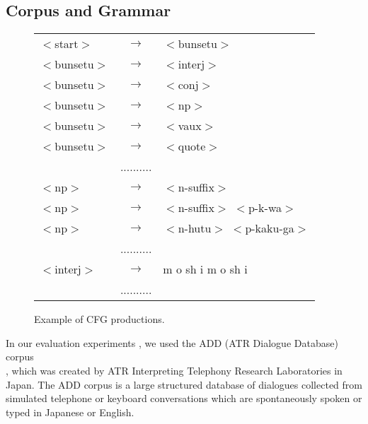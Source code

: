 \subsection{Corpus and Grammar}

\begin{figure}[b]
\begin{center}
\begin{tabular}{lcl}
\hline
     $<$start$>$   & $\longrightarrow$ &  $<$bunsetu$>$	\\
     $<$bunsetu$>$ & $\longrightarrow$ &  $<$interj$>$	\\
     $<$bunsetu$>$ & $\longrightarrow$ &  $<$conj$>$	\\
     $<$bunsetu$>$ & $\longrightarrow$ &  $<$np$>$	\\
     $<$bunsetu$>$ & $\longrightarrow$ &  $<$vaux$>$	\\
     $<$bunsetu$>$ & $\longrightarrow$ &  $<$quote$>$	\\
		&     ..........	\\
     $<$np$>$	   & $\longrightarrow$ &  $<$n-suffix$>$ \\
     $<$np$>$	   & $\longrightarrow$ &  $<$n-suffix$>$  $<$p-k-wa$>$\\
     $<$np$>$	   & $\longrightarrow$ &  $<$n-hutu$>$  $<$p-kaku-ga$>$\\
		&     ..........	\\
     $<$interj$>$  & $\longrightarrow$ &  m o sh i m o sh i	\\
		&     ..........	\\
\hline
\end{tabular}
\end{center}
\caption{Example of CFG productions.} \label{Fig:Prods}
\end{figure}

In \hspace*{1mm}our \hspace*{1mm}evaluation \hspace*{1mm}experiments , \hspace*{1mm}we \hspace*{1mm}used \hspace*{1mm}the \hspace*{1mm}ADD \hspace*{1mm}(ATR Dialogue Database) \hspace*{1mm}corpus \\
\cite{Ehara90} , which was created by ATR Interpreting Telephony Research Laboratories in Japan.
The ADD corpus is a large structured database of dialogues collected
from simulated telephone or keyboard conversations
which are spontaneously spoken or typed in Japanese or English.

